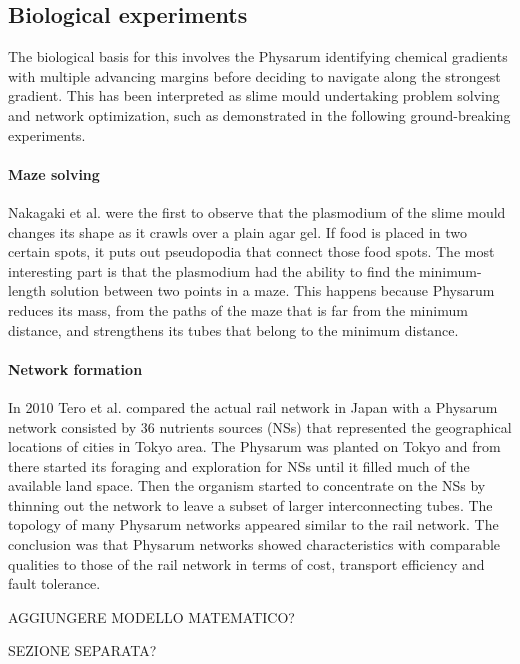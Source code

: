 \subsection{Biological experiments}
The biological basis for this involves the Physarum identifying chemical gradients with multiple advancing margins before deciding to navigate along the strongest gradient. This has been interpreted as slime mould undertaking problem solving and network optimization, such as demonstrated in the following ground-breaking experiments.

\paragraph{Maze solving}
Nakagaki et al. \cite{nakagaki2000intelligence} were the first to observe that the plasmodium of the slime mould changes its shape as it crawls over a plain agar gel. If food is placed in two certain spots, it puts out pseudopodia that connect those food spots. The most interesting part is that the plasmodium had the ability to find the minimum-length solution between two points in a maze. This happens because Physarum reduces its mass, from the paths of the maze that is far from the minimum distance, and strengthens its tubes that belong to the minimum distance.

\paragraph{Network formation}
In 2010 Tero et al. \cite{Tero439} compared the actual rail network in Japan with a Physarum network consisted by 36 nutrients sources (NSs) that represented the geographical locations of cities in Tokyo area. The Physarum was planted on Tokyo and from there started its foraging  and exploration for NSs until it filled much of the available land space. Then the organism started to concentrate on the NSs by thinning out the network to leave a subset of larger interconnecting tubes. The topology of many Physarum networks appeared similar to the rail network. The conclusion was that Physarum networks showed characteristics with comparable qualities to those of the rail network in terms of cost, transport efficiency and fault tolerance.\\

\par
AGGIUNGERE MODELLO MATEMATICO?
\par

\par
SEZIONE SEPARATA?

